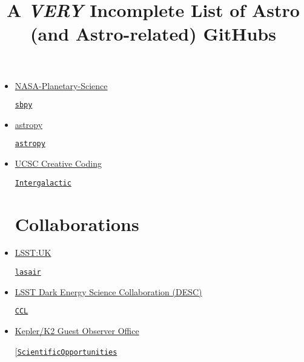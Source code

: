 \documentclass[11pt,a4paper]{article}
\begin{document}
\title{A {\it VERY} Incomplete List of Astro (and Astro-related) GitHubs}
\maketitle



\begin{itemize}


\section*{Organisations}  

\item \href{https://github.com/NASA-Planetary-Science}{NASA-Planetary-Science}
  \begin{itemize}
    \href{https://github.com/NASA-Planetary-Science/sbpy}{{\tt sbpy}}
  \end{itemize}
  
\item \href{https://github.com/astropy}{astropy}
  \begin{itemize}
    \href{https://github.com/astropy/astropy}{{\tt astropy}}
  \end{itemize}

\item \href{https://github.com/CreativeCodingLab}{UCSC Creative Coding}
  \begin{itemize}
    \href{https://github.com/CreativeCodingLab/Intergalactic}{{\tt Intergalactic}}
  \end{itemize}



\section*{Collaborations}  
\item \href{https://github.com/lsst-uk}{LSST:UK}
  \begin{itemize}
    \href{https://github.com/lsst-uk/lasair/}{{\tt lasair}}
  \end{itemize}

\item \href{https://github.com/LSSTDESC}{LSST Dark Energy Science Collaboration (DESC)}
  \begin{itemize}
    \href{https://github.com/LSSTDESC/CCL}{{\tt CCL}}
  \end{itemize}


\item \href{https://github.com/KeplerGO/}{Kepler/K2 Guest Observer Office}
  \begin{itemize}
    \href{https://github.com/KeplerGO/ScientificOpportunities}{[\tt ScientificOpportunities}
  \end{itemize}
  


\end{itemize}
\end{document}
